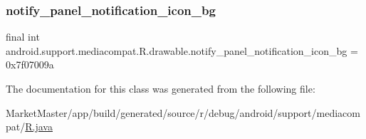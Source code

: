 \subsubsection{\texorpdfstring{notify\+\_\+panel\+\_\+notification\+\_\+icon\+\_\+bg}{notify\_panel\_notification\_icon\_bg}}
{\footnotesize\ttfamily final int android.\+support.\+mediacompat.\+R.\+drawable.\+notify\+\_\+panel\+\_\+notification\+\_\+icon\+\_\+bg = 0x7f07009a\hspace{0.3cm}{\ttfamily [static]}}



The documentation for this class was generated from the following file\+:\begin{DoxyCompactItemize}
\item 
Market\+Master/app/build/generated/source/r/debug/android/support/mediacompat/\mbox{\hyperlink{debug_2android_2support_2mediacompat_2R_8java}{R.\+java}}\end{DoxyCompactItemize}
